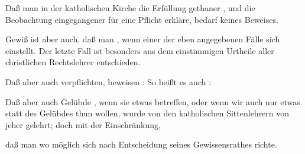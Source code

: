 \begin{aufza}
\item Daß man in der katholischen Kirche die Erfüllung gethaner , und die Beobachtung eingegangener  für eine Pflicht erkläre, bedarf keines Beweises.
\item Gewiß ist aber auch, daß man , wenn einer der eben angegebenen Fälle sich einstellt. Der letzte Fall ist besonders aus dem einstimmigen Urtheile aller christlichen Rechtslehrer entschieden.
\item Daß aber auch  verpflichten, beweisen  :  So heißt es auch : 
\item Daß aber auch Gelübde , wenn sie etwas  betreffen, oder wenn wir auch nur etwas  statt des Gelübdes thun wollen, wurde von den katholischen Sittenlehrern von jeher gelehrt; doch mit der Einschränkung,
\item daß man wo möglich sich nach Entscheidung seines Gewissensrathes richte.
\end{aufza}

